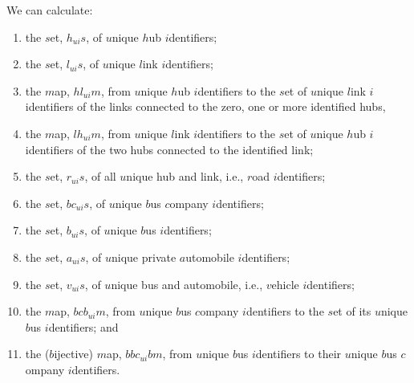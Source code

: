 \label{p-All Unique Identifiers of a Domain}\label{p-ui-sets}\LLll
We can calculate:
\begin{enumerate}\setei
\item \label{p-uic-000} the $s$et, $h_{ui}s$, of $u$nique $h$ub
                      $i$dentifiers; 
\item \label{p-uic-010} the $s$et, $l_{ui}s$, of $u$nique $l$ink
                      $i$dentifiers; 
\item \label{p-uic-011a} the $m$ap, $hl_{ui}m$, from $u$nique $h$ub
                      $i$dentifiers to the $s$et of $u$nique $l$ink
                      $i$identifiers of the links connected to the
                      zero, one or more identified hubs,
\item \label{p-uic-011b} the $m$ap, $lh_{ui}m$, from $u$nique $l$ink
                      $i$dentifiers to the $s$et of $u$nique $h$ub
                      $i$identifiers of the two hubs connected to the 
                      identified link; 
\item \label{p-uic-011} the $s$et, $r_{ui}s$, of all $u$nique hub and
                      link, i.e., 
                      $r$oad $i$dentifiers;
\item \label{p-uic-020} the $s$et, $bc_{ui}s$, of $u$nique $b$us
                      $c$ompany
                      $i$dentifiers;
\item \label{p-uic-030} the $s$et, $b_{ui}s$, of $u$nique $b$us
  $i$dentifiers; 
\item \label{p-uic-040} the $s$et, $a_{ui}s$, of $u$nique private
                      $a$utomobile
                      $i$dentifiers;
\item \label{p-uic-041} the $s$et, $v_{ui}s$, of $u$nique bus and
                      automobile, i.e., 
                      $v$ehicle $i$dentifiers; 
\item \label{p-uic-042} the $m$ap, $bcb_{ui}m$, from $u$nique $b$us
                      $c$ompany $i$dentifiers to the $s$et 
                      of its  $u$nique $b$us $i$dentifiers;
                      and  
\item \label{p-uic-043} the ($b$ijective) $m$ap, $bbc_{ui}bm$, from
                      $u$nique $b$us $i$dentifiers to 
                      their $u$nique $b$us $c$ompany
                      $i$dentifiers. 
\savei\end{enumerate}
